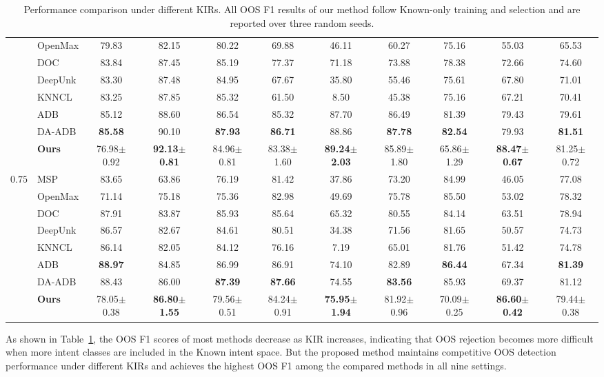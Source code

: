 \documentclass[11pt]{article}
\begin{document}
\begin{table}[!t]
{\begin{tabular}{c|l|ccc|ccc|ccc}
& OpenMax & 79.83 & 82.15 & 80.22 & 69.88 & 46.11 & 60.27 & 75.16 & 55.03 & 65.53\\
& DOC & 83.84 & 87.45 & 85.19 & 77.37 & 71.18 & 73.88 & 78.38 & 72.66 & 74.60\\
& DeepUnk & 83.30 & 87.48 & 84.95 & 67.67 & 35.80 & 55.46 & 75.61 & 67.80 & 71.01\\
& KNNCL & 83.25 & 87.85 & 85.32 & 61.50 & 8.50 & 45.38 & 75.16 & 67.21 & 70.41\\
& ADB & 85.12 & 88.60 & 86.54 & 85.32 & 87.70 & 86.49 & 81.39 & 79.43 & 79.61\\
& DA-ADB & \textbf{85.58} & 90.10 & \textbf{87.93} & \textbf{86.71} & 88.86 & \textbf{87.78} & \textbf{82.54} & 79.93 & \textbf{81.51}\\
& \textbf{Ours} & 76.98$\pm$0.92 & \textbf{92.13$\pm$0.81} & 84.96$\pm$0.81 & 83.38$\pm$1.60 & \textbf{89.24$\pm$2.03} & 85.89$\pm$1.80 & 65.86$\pm$1.29 & \textbf{88.47$\pm$0.67} & 81.25$\pm$0.72\\
\midrule
\multirow{8}{*}{$0.75$}
& MSP & 83.65 & 63.86 & 76.19 & 81.42 & 37.86 & 73.20 & 84.99 & 46.05 & 77.08\\
& OpenMax & 71.14 & 75.18 & 75.36 & 82.98 & 49.69 & 75.78 & 85.50 & 53.02 & 78.32\\
& DOC & 87.91 & 83.87 & 85.93 & 85.64 & 65.32 & 80.55 & 84.14 & 63.51 & 78.94\\
& DeepUnk & 86.57 & 82.67 & 84.61 & 80.51 & 34.38 & 71.56 & 81.65 & 50.57 & 74.73\\
& KNNCL & 86.14 & 82.05 & 84.12 & 76.16 & 7.19 & 65.01 & 81.76 & 51.42 & 74.78\\
& ADB & \textbf{88.97} & 84.85 & 86.99 & 86.91 & 74.10 & 82.89 & \textbf{86.44} & 67.34 & \textbf{81.39}\\
& DA-ADB & 88.43 & 86.00 & \textbf{87.39} & \textbf{87.66} & 74.55 & \textbf{83.56} & 85.93 & 69.37 & 81.12\\
& \textbf{Ours} & 78.05$\pm$0.38 & \textbf{86.80$\pm$1.55} & 79.56$\pm$0.51 & 84.24$\pm$0.91 & \textbf{75.95$\pm$1.94} & 81.92$\pm$0.96 & 70.09$\pm$0.25 & \textbf{86.60$\pm$0.42} & 79.44$\pm$0.38\\
\bottomrule
\end{tabular}
}
\caption{Performance comparison under different KIRs. All OOS F1 results of our method follow Known-only training and selection and are reported over three random seeds.}
\label{tab:main_results_all}
\end{table}

As shown in Table~\ref{tab:main_results_all}, the OOS F1 scores of most methods decrease as KIR increases, indicating that OOS rejection becomes more difficult when more intent classes are included in the Known intent space. But the proposed method maintains competitive OOS detection performance under different KIRs and achieves the highest OOS F1 among the compared methods in all nine settings.
\end{document}
